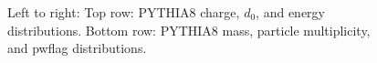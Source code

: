 \begin{figure}[H]
\hfill
{}\hfill
\caption{Left to right: Top row: PYTHIA8 charge, $d_0$, and energy distributions. Bottom row: PYTHIA8 mass, particle multiplicity, and pwflag distributions.}
\end{figure}

